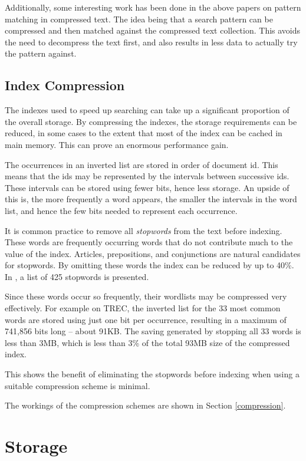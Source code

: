 Additionally, some interesting work has been done in the above papers on pattern matching in compressed text.  The idea being that a search pattern can be compressed and then matched against the compressed text collection.  This avoids the need to decompress the text first, and also results in less data to actually try the pattern against.

\subsection{Index Compression}
The indexes used to speed up searching can take up a significant
proportion of the overall storage.  By compressing the indexes, the
storage requirements can be reduced, in some cases to the extent that most
of the index can be cached in main memory.  This can prove an enormous
performance gain.

The occurrences in an inverted list are stored in order of document id.
This means that the ids may be represented by the intervals between
successive ids.  These intervals can be stored using fewer bits, hence
less storage.  An upside of this is, the more frequently a word appears,
the smaller the intervals in the word list, and hence the few bits needed
to represent each occurrence.

It is common practice to remove all \emph{stopwords} from the text before
indexing.  These words are frequently occurring words that do not
contribute much to the value of the index.  Articles, prepositions, and
conjunctions are natural candidates for stopwords.  By omitting these
words the index can be reduced by up to 40\%.  In \cite{francis82}, a list of
425 stopwords is presented.


Since these words occur so frequently, their wordlists may be compressed
very effectively.  For example on TREC, the inverted list for the 33 most
common words are stored using just one bit per occurrence, resulting in a
maximum of 741,856 bits long -- about 91KB.  The saving generated by
stopping all 33 words is less than 3MB, which is less than 3\% of the
total 93MB size of the compressed index.

This shows the benefit of eliminating the stopwords before indexing when
using a suitable compression scheme is minimal.  

The workings of the compression schemes are shown in Section
\ref{compression}.

\section{Storage}
